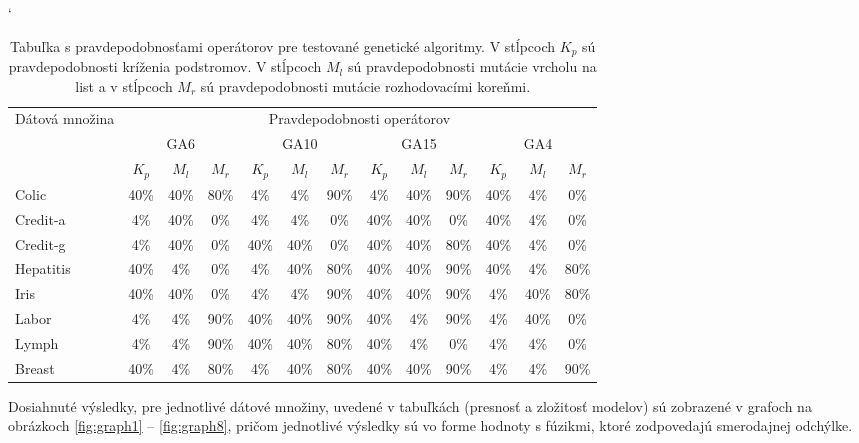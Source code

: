\begin{table}[t]
\catcode`
\centering 
\setlength\tabcolsep{0.1cm}
\newcommand\T{\rule{0pt}{2.6ex}}       %
\newcommand\B{\rule[-1.2ex]{0pt}{0pt}} %
\begin{tabular}{|l||c c c|c c c|c c c|c c c||}
\hline \multirow{3}{2cm}{Dátová množina} &
\multicolumn{12}{c||}{Pravdepodobnosti operátorov} \\
\cline{2-13} &
\multicolumn{3}{c|}{GA6} & \multicolumn{3}{c|}{GA10} & \multicolumn{3}{c|}{GA15} & \multicolumn{3}{c||}{GA4} \\
\cline{2-13} &  $K_p$ & $M_l$ & $M_r$ & $K_p$ & $M_l$ & $M_r$ & $K_p$ & $M_l$ & $M_r$ & $K_p$ & $M_l$ & $M_r$ \\
\hline 
Colic & 40\% & 40\% & 80\% & 4\% & 4\% & 90\% & 4\% & 40\% & 90\% & 40\% & 4\% & 0\% \T\B\\
\hline
Credit-a & 4\% & 40\% & 0\% & 4\% & 4\% & 0\% & 40\% & 40\% & 0\% & 40\% & 4\% & 0\% \T\B\\
\hline
Credit-g & 4\% & 40\% & 0\% & 40\% & 40\% & 0\% & 40\% & 40\% & 80\% & 40\% & 4\% & 0\% \T\B\\
\hline
Hepatitis & 40\% & 4\% & 0\% & 4\% & 40\% & 80\% & 40\% & 40\% & 90\% & 40\% & 4\% & 80\% \T\B\\
\hline
Iris & 40\% & 40\% & 0\% & 4\% & 4\% & 90\% & 40\% & 40\% & 90\% & 4\% & 40\% & 80\% \T\B\\
\hline
Labor & 4\% & 4\% & 90\% & 40\% & 40\% & 90\% & 40\% & 4\% & 90\% & 4\% & 40\% & 0\% \T\B\\
\hline
Lymph & 4\% & 4\% & 90\% & 40\% & 40\% & 80\% & 40\% & 4\% & 0\% & 4\% & 4\% & 0\% \T\B\\
\hline
Breast & 40\% & 4\% & 80\% & 4\% & 40\% & 80\% & 40\% & 40\% & 90\% & 4\% & 4\% & 90\% \T\B\\
\hline
\end{tabular}
\caption{Tabuľka s pravdepodobnosťami operátorov pre testované genetické algoritmy. V stĺpcoch $K_p$ sú pravdepodobnosti kríženia podstromov. V stĺpcoch $M_l$ sú pravdepodobnosti mutácie vrcholu na list a v stĺpcoch $M_r$ sú pravdepodobnosti mutácie rozhodovacími koreňmi.}\label{fig:setconfig}
\end{table}

Dosiahnuté výsledky, pre jednotlivé dátové množiny, uvedené v tabuľkách (presnosť a zložitosť modelov) sú zobrazené v grafoch na obrázkoch \ref{fig:graph1} -- \ref{fig:graph8}, pričom jednotlivé výsledky sú vo forme hodnoty s fúzikmi, ktoré zodpovedajú smerodajnej odchýlke.

